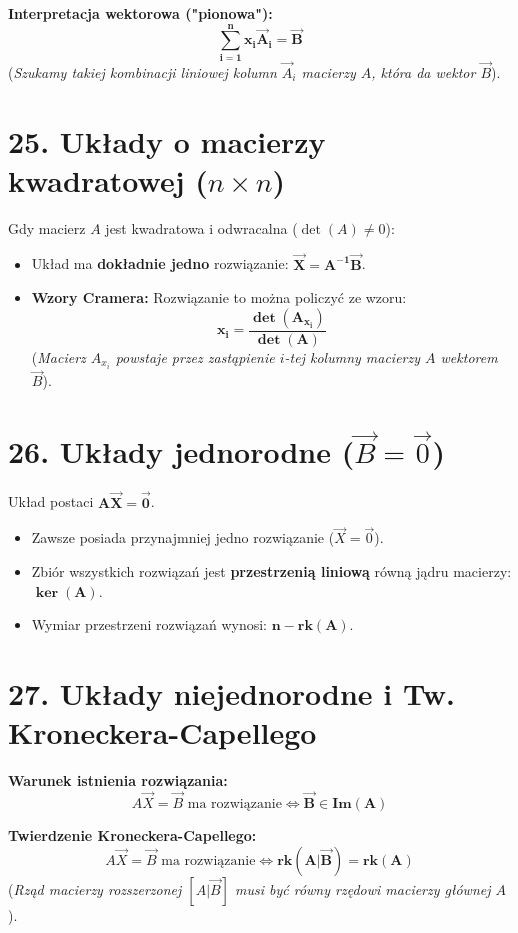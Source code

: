 \documentclass[12pt,a4paper]{article}
\begin{document}
\noindent\textbf{Interpretacja wektorowa ("pionowa"):} %
$$ \mathbf{\sum_{i=1}^n x_i \vec{A}_i = \vec{B}} $$
(\textit{Szukamy takiej kombinacji liniowej kolumn $\vec{A}_i$ macierzy $A$, która da wektor $\vec{B}$}). %

\section*{25. Układy o macierzy kwadratowej ($n \times n$)}
Gdy macierz $A$ jest kwadratowa i odwracalna ($\det(A) \neq 0$): %
\begin{itemize}
    \item Układ ma \textbf{dokładnie jedno} rozwiązanie: $\mathbf{\vec{X} = A^{-1}\vec{B}}$. %
    \item \textbf{Wzory Cramera:} Rozwiązanie to można policzyć ze wzoru: %
    $$ \mathbf{x_i = \frac{\det(A_{x_i})}{\det(A)}} $$
    (\textit{Macierz $A_{x_i}$ powstaje przez zastąpienie $i$-tej kolumny macierzy $A$ wektorem $\vec{B}$}). %
\end{itemize}

\section*{26. Układy jednorodne ($\vec{B} = \vec{0}$)}
Układ postaci $\mathbf{A\vec{X} = \vec{0}}$. %
\begin{itemize}
    \item Zawsze posiada przynajmniej jedno rozwiązanie ($\vec{X} = \vec{0}$). %
    \item Zbiór wszystkich rozwiązań jest \textbf{przestrzenią liniową} równą jądru macierzy: $\mathbf{\ker(A)}$. %
    \item Wymiar przestrzeni rozwiązań wynosi: $\mathbf{n - rk(A)}$. %
\end{itemize}

\section*{27. Układy niejednorodne i Tw. Kroneckera-Capellego}
\noindent\textbf{Warunek istnienia rozwiązania:} %
$$ A\vec{X} = \vec{B} \text{ ma rozwiązanie} \iff \mathbf{\vec{B} \in Im(A)} $$ %

\noindent\textbf{Twierdzenie Kroneckera-Capellego:} %
$$ A\vec{X} = \vec{B} \text{ ma rozwiązanie} \iff \mathbf{rk(A|\vec{B}) = rk(A)} $$ %
(\textit{Rząd macierzy rozszerzonej $[A|\vec{B}]$ musi być równy rzędowi macierzy głównej $A$}). %
\end{document}
